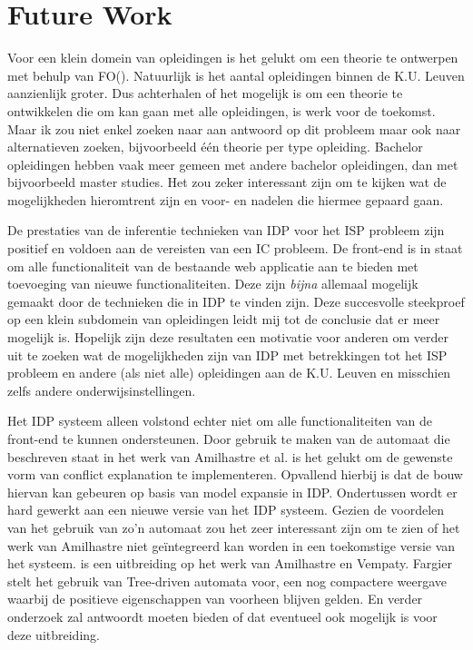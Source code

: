 \chapter{Future Work}
\label{cha:futurework}
Voor een klein domein van opleidingen is het gelukt om een theorie te ontwerpen met behulp van FO(\textperiodcentered). Natuurlijk is het aantal opleidingen binnen de K.U. Leuven aanzienlijk groter. Dus achterhalen of het mogelijk is om een theorie te ontwikkelen die om kan gaan met alle opleidingen, is werk voor de toekomst. Maar ik zou niet enkel zoeken naar aan antwoord op dit probleem maar ook naar alternatieven zoeken, bijvoorbeeld \'{e}\'{e}n theorie per type opleiding. Bachelor opleidingen hebben vaak meer gemeen met andere bachelor opleidingen, dan met bijvoorbeeld master studies. Het zou zeker interessant zijn om te kijken wat de mogelijkheden hieromtrent zijn en voor- en nadelen die hiermee gepaard gaan. 

De prestaties van de inferentie technieken van IDP voor het ISP probleem zijn positief en voldoen aan de vereisten van een IC probleem. De front-end is in staat om alle functionaliteit van de bestaande web applicatie aan te bieden met toevoeging van nieuwe functionaliteiten. Deze zijn \textit{bijna} allemaal mogelijk gemaakt door de technieken die in IDP te vinden zijn. Deze succesvolle steekproef op een klein subdomein van opleidingen leidt mij tot de conclusie dat er meer mogelijk is. Hopelijk zijn deze resultaten een motivatie voor anderen om verder uit te zoeken wat de mogelijkheden zijn van IDP met betrekkingen tot het ISP probleem en andere (als niet alle) opleidingen aan de K.U. Leuven en misschien zelfs andere onderwijsinstellingen. 

Het IDP systeem alleen volstond echter niet om alle functionaliteiten van de front-end te kunnen ondersteunen. Door gebruik te maken van de automaat die beschreven staat in het werk van Amilhastre et al. is het gelukt om de gewenste vorm van conflict explanation te implementeren. Opvallend hierbij is dat de bouw hiervan kan gebeuren op basis van model expansie in IDP. Ondertussen wordt er hard gewerkt aan een nieuwe versie van het IDP systeem. Gezien de voordelen van het gebruik van zo'n automaat zou het zeer interessant zijn om te zien of het werk van Amilhastre niet ge\"{i}ntegreerd kan worden in een toekomstige versie van het systeem. \citep{fargier2004compiling} is een uitbreiding op het werk van Amilhastre en Vempaty. Fargier stelt het gebruik van Tree-driven automata voor, een nog compactere weergave waarbij de positieve eigenschappen van voorheen blijven gelden. En verder onderzoek zal antwoordt moeten bieden of dat eventueel ook mogelijk is voor deze uitbreiding. 
